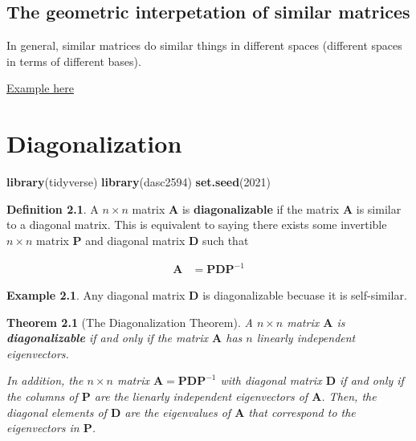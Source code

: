 \documentclass[
]{book}
\newenvironment{Shaded}{\begin{snugshade}}{\end{snugshade}}
\newcommand{\DecValTok}[1]{\textcolor[rgb]{0.00,0.00,0.81}{#1}}
\newcommand{\KeywordTok}[1]{\textcolor[rgb]{0.13,0.29,0.53}{\textbf{#1}}}
\newcommand{\NormalTok}[1]{#1}
\newtheorem{theorem}{Theorem}[chapter]
\theoremstyle{definition}
\newtheorem{definition}{Definition}[chapter]
\theoremstyle{definition}
\newtheorem{example}{Example}[chapter]
\theoremstyle{definition}
\theoremstyle{definition}
\theoremstyle{remark}
\begin{document}
\hypertarget{the-geometric-interpetation-of-similar-matrices}{%
\section{The geometric interpetation of similar matrices}\label{the-geometric-interpetation-of-similar-matrices}}

In general, similar matrices do similar things in different spaces (different spaces in terms of different bases).

\href{https://textbooks.math.gatech.edu/ila/similarity.html}{Example here}

\hypertarget{diagonalization}{%
\chapter{Diagonalization}\label{diagonalization}}

\begin{Shaded}
\begin{Highlighting}[]
\KeywordTok{library}\NormalTok{(tidyverse)}
\KeywordTok{library}\NormalTok{(dasc2594)}
\KeywordTok{set.seed}\NormalTok{(}\DecValTok{2021}\NormalTok{)}
\end{Highlighting}
\end{Shaded}

\begin{definition}
A \(n \times n\) matrix \(\mathbf{A}\) is \textbf{diagonalizable} if the matrix \(\mathbf{A}\) is similar to a diagonal matrix. This is equivalent to saying there exists some invertible \(n \times n\) matrix \(\mathbf{P}\) and diagonal matrix \(\mathbf{D}\) such that

\[
\begin{aligned}
\mathbf{A} & = \mathbf{P} \mathbf{D} \mathbf{P}^{-1}
\end{aligned}
\]
\end{definition}

\begin{example}
Any diagonal matrix \(\mathbf{D}\) is diagonalizable becuase it is self-similar.
\end{example}

\begin{theorem}[The Diagonalization Theorem]
\protect\hypertarget{thm:diagonalization}{}\label{thm:diagonalization}A \(n \times n\) matrix \(\mathbf{A}\) is \textbf{diagonalizable} if and only if the matrix \(\mathbf{A}\) has \(n\) linearly independent eigenvectors.

In addition, the \(n \times n\) matrix \(\mathbf{A} = \mathbf{P} \mathbf{D} \mathbf{P}^{-1}\) with diagonal matrix \(\mathbf{D}\) if and only if the columns of \(\mathbf{P}\) are the lienarly independent eigenvectors of \(\mathbf{A}\). Then, the diagonal elements of \(\mathbf{D}\) are the eigenvalues of \(\mathbf{A}\) that correspond to the eigenvectors in \(\mathbf{P}\).
\end{theorem}
\end{document}
